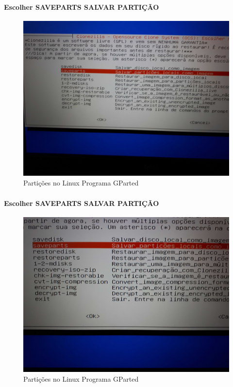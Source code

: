 \documentclass{beamer}
\begin{document}
\begin{frame}[plain,c]
   \frametitle{\insertsection}
    \framesubtitle{Escolher SAVEPARTS SALVAR PARTIÇÃO}
    \begin{figure}[!h]
        \includegraphics[width=1\linewidth]{images/backup/bkp14.jpg}
        \caption{Partições no Linux Programa GParted}
    \end{figure}
\end{frame}
\begin{frame}[plain,c]
   \frametitle{\insertsection}
    \framesubtitle{Escolher SAVEPARTS SALVAR PARTIÇÃO}
    \begin{figure}[!h]
        \includegraphics[width=1\linewidth]{images/backup/bkp15.jpg}
        \caption{Partições no Linux Programa GParted}
    \end{figure}
\end{frame}
\end{document}
